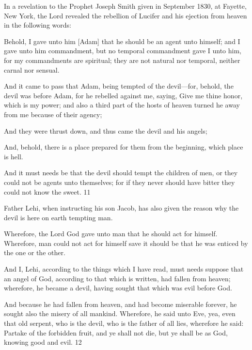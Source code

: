 In a revelation to the Prophet Joseph Smith given in September 1830, at Fayette, New York,
the Lord revealed the rebellion of Lucifer and his ejection from heaven in the following
words:

Behold, I gave unto him [Adam] that he should be an agent unto himself; and I gave unto
him commandment, but no temporal commandment gave I unto him, for my commandments
are spiritual; they are not natural nor temporal, neither carnal nor sensual.

And it came to pass that Adam, being tempted of the devil—for, behold, the devil was before
Adam, for he rebelled against me, saying, Give me thine honor, which is my power; and also
a third part of the hosts of heaven turned he away from me because of their agency;

And they were thrust down, and thus came the devil and his angels;

And, behold, there is a place prepared for them from the beginning, which place is hell.

And it must needs be that the devil should tempt the children of men, or they could not be
agents unto themselves; for if they never should have bitter they could not know the sweet.
11

Father Lehi, when instructing his son Jacob, has also given the reason why the devil is here
on earth tempting man.

Wherefore, the Lord God gave unto man that he should act for himself. Wherefore, man
could not act for himself save it should be that he was enticed by the one or the other.

And I, Lehi, according to the things which I have read, must needs suppose that an angel of
God, according to that which is written, had fallen from heaven; wherefore, he became a
devil, having sought that which was evil before God.

And because he had fallen from heaven, and had become miserable forever, he sought also
the misery of all mankind. Wherefore, he said unto Eve, yea, even that old serpent, who is the
devil, who is the father of all lies, wherefore he said: Partake of the forbidden fruit, and ye
shall not die, but ye shall be as God, knowing good and evil. 12

